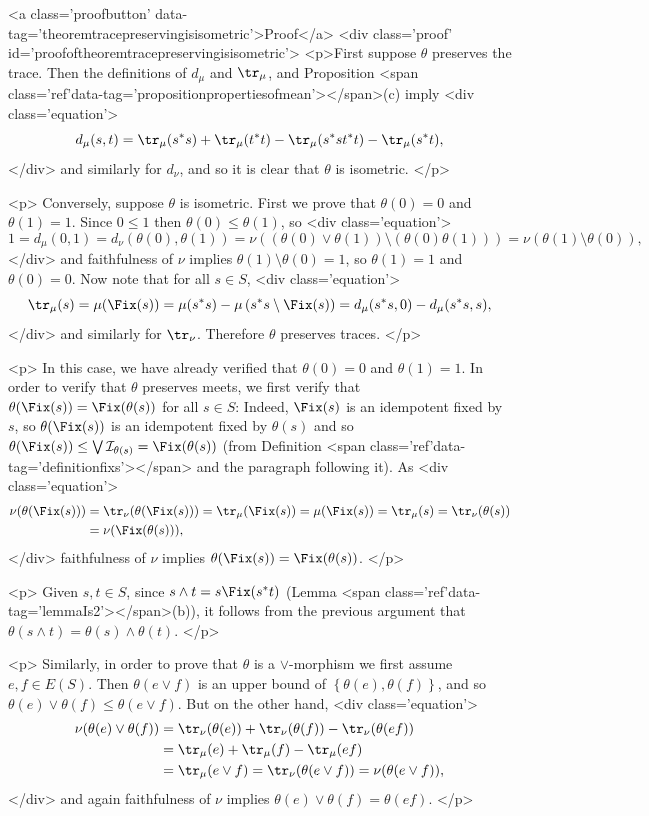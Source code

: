 <a class='proofbutton' data-tag='theoremtracepreservingisisometric'>Proof</a>
<div class='proof' id='proofoftheoremtracepreservingisisometric'>
<p>First suppose $\theta$ preserves the trace. Then the definitions of $d_\mu$ and $\tr_\mu$, and Proposition <span class='ref'data-tag='propositionpropertiesofmean'></span>(c) imply
<div class='equation'>\[
d_\mu(s,t)=\tr_\mu(s^*s)+\tr_\mu(t^*t)-\tr_\mu(s^*st^*t)-\tr_\mu(s^*t),
\]</div>
and similarly for $d_\nu$, and so it is clear that $\theta$ is isometric.
</p>

<p>
Conversely, suppose $\theta$ is isometric. First we prove that $\theta(0)=0$ and $\theta(1)=1$. Since $0\leq 1$ then $\theta(0)\leq \theta(1)$, so
<div class='equation'>\[
1=d_\mu(0,1)=d_\nu(\theta(0),\theta(1))=\nu((\theta(0)\lor\theta(1))\setminus(\theta(0)\theta(1)))=\nu(\theta(1)\setminus\theta(0)),
\]</div>
and faithfulness of $\nu$ implies $\theta(1)\setminus\theta(0)=1$, so $\theta(1)=1$ and $\theta(0)=0$. Now note that for all $s\in S$,
<div class='equation'>\[
\tr_\mu(s)=\mu(\Fix(s))=\mu(s^*s)-\mu\left(s^*s\setminus\Fix(s)\right)=d_\mu(s^*s,0)-d_\mu(s^*s,s),
\]</div>
and similarly for $\tr_\nu$. Therefore $\theta$ preserves traces.
</p>

<p>
In this case, we have already verified that $\theta(0)=0$ and $\theta(1)=1$. In order to verify that $\theta$ preserves meets, we first verify that $\theta(\Fix(s))=\Fix(\theta(s))$ for all $s\in S$: Indeed, $\Fix(s)$ is an idempotent fixed by $s$, so $\theta(\Fix(s))$ is an idempotent fixed by $\theta(s)$ and so $\theta(\Fix(s))\leq\bigvee\mathcal{I}_{\theta(s)}=\Fix(\theta(s))$ (from Definition <span class='ref'data-tag='definitionfixs'></span> and the paragraph following it).  As
<div class='equation'>\begin{align*}
\nu(\theta(\Fix(s)))&=\tr_\nu(\theta(\Fix(s)))=\tr_\mu(\Fix(s))=\mu(\Fix(s))=\tr_\mu(s)=\tr_\nu(\theta(s))\\
&=\nu(\Fix(\theta(s))),
\end{align*}</div>
faithfulness of $\nu$ implies $\theta(\Fix(s))=\Fix(\theta(s))$.
</p>

<p>
Given $s,t\in S$, since $s\land t=s\Fix(s^*t)$ (Lemma <span class='ref'data-tag='lemmaIs2'></span>(b)), it follows from the previous argument that $\theta(s\land t)=\theta(s)\land \theta(t)$.
</p>

<p>
Similarly, in order to prove that $\theta$ is a $\lor$-morphism we first assume $e,f\in E(S)$. Then $\theta(e\lor f)$ is an upper bound of $\left\{\theta(e),\theta(f)\right\}$, and so $\theta(e)\lor\theta(f)\leq\theta(e\lor f)$. But on the other hand,
<div class='equation'>\begin{align*}
\nu(\theta(e)\lor\theta(f))&=\tr_\nu(\theta(e))+\tr_\nu(\theta(f))-\tr_\nu(\theta(ef))\\
&=\tr_\mu(e)+\tr_\mu(f)-\tr_\mu(ef)\\
&=\tr_\mu(e\lor f)=\tr_\nu(\theta(e\lor f))=\nu(\theta(e\lor f)),
\end{align*}</div>
and again faithfulness of $\nu$ implies $\theta(e)\lor\theta(f)=\theta(ef)$.
</p>

